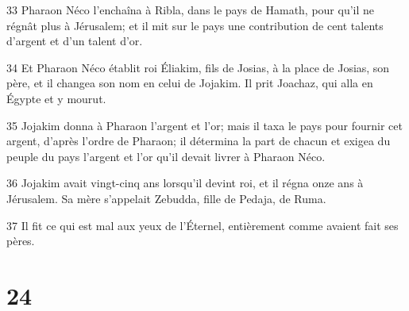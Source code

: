 \par 33 Pharaon Néco l'enchaîna à Ribla, dans le pays de Hamath, pour qu'il ne régnât plus à Jérusalem; et il mit sur le pays une contribution de cent talents d'argent et d'un talent d'or.
\par 34 Et Pharaon Néco établit roi Éliakim, fils de Josias, à la place de Josias, son père, et il changea son nom en celui de Jojakim. Il prit Joachaz, qui alla en Égypte et y mourut.
\par 35 Jojakim donna à Pharaon l'argent et l'or; mais il taxa le pays pour fournir cet argent, d'après l'ordre de Pharaon; il détermina la part de chacun et exigea du peuple du pays l'argent et l'or qu'il devait livrer à Pharaon Néco.
\par 36 Jojakim avait vingt-cinq ans lorsqu'il devint roi, et il régna onze ans à Jérusalem. Sa mère s'appelait Zebudda, fille de Pedaja, de Ruma.
\par 37 Il fit ce qui est mal aux yeux de l'Éternel, entièrement comme avaient fait ses pères.

\chapter{24}

